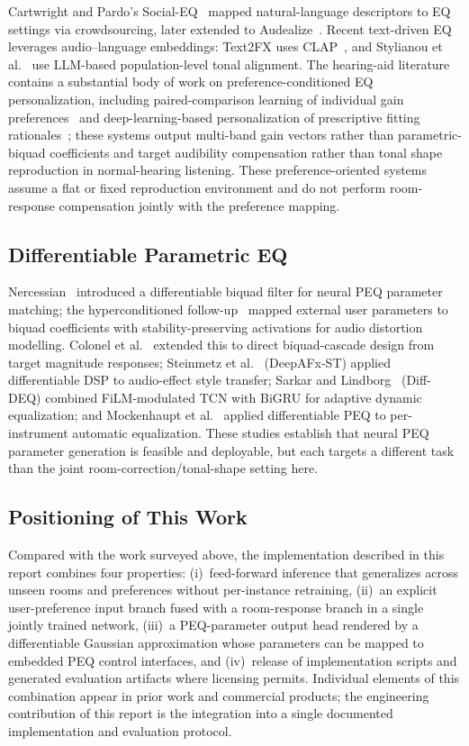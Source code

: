 \documentclass{aes2e}
\begin{document}
Cartwright and Pardo's Social-EQ~\cite{cartwright2013} mapped
natural-language descriptors to EQ settings via crowdsourcing, later
extended to Audealize~\cite{seetharaman2016}. Recent text-driven EQ
leverages audio--language embeddings: Text2FX uses
CLAP~\cite{chu2025}, and Stylianou et al.~\cite{stylianou2026} use
LLM-based population-level tonal alignment.
The hearing-aid literature contains a substantial body of work on
preference-conditioned EQ personalization, including paired-comparison
learning of individual gain preferences~\cite{keidser2006,nielsen2013} and
deep-learning-based personalization of prescriptive fitting
rationales~\cite{mondol2022}; these systems output multi-band gain
vectors rather than parametric-biquad coefficients and target audibility
compensation rather than tonal shape reproduction in normal-hearing
listening.
These preference-oriented systems assume a flat or fixed reproduction
environment and do not perform room-response compensation jointly with the
preference mapping.

\subsection{Differentiable Parametric EQ}

Nercessian~\cite{nercessian2020} introduced a differentiable biquad
filter for neural PEQ parameter matching; the hyperconditioned
follow-up~\cite{nercessian2021_hc} mapped external user parameters to
biquad coefficients with stability-preserving activations for audio
distortion modelling. Colonel et al.~\cite{colonel2022} extended this
to direct biquad-cascade design from target magnitude responses;
Steinmetz et al.~\cite{steinmetz2022} (DeepAFx-ST) applied
differentiable DSP to audio-effect style transfer;
Sarkar and Lindborg~\cite{sarkar2025} (Diff-DEQ) combined
FiLM-modulated TCN with BiGRU for adaptive dynamic equalization;
and Mockenhaupt et al.~\cite{mockenhaupt2024} applied differentiable
PEQ to per-instrument automatic equalization. These studies establish
that neural PEQ parameter generation is feasible and deployable, but
each targets a different task than the joint
room-correction/tonal-shape setting here.

\subsection{Positioning of This Work}

Compared with the work surveyed above, the implementation described in
this report combines four properties: (i)~feed-forward inference that
generalizes across unseen rooms and preferences without per-instance
retraining, (ii)~an explicit user-preference input branch fused with a
room-response branch in a single jointly trained network, (iii)~a
PEQ-parameter output head rendered by a differentiable Gaussian approximation
whose parameters can be mapped to embedded PEQ control interfaces, and
(iv)~release of implementation scripts and generated evaluation artifacts
where licensing permits.
Individual elements of this combination appear in prior work and commercial
products; the engineering contribution of this report is the integration
into a single documented implementation and evaluation protocol.
\end{document}
